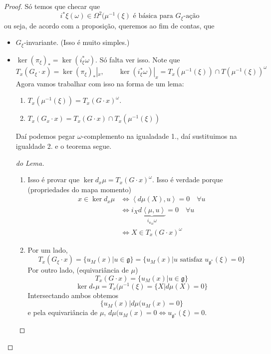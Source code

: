 \begin{proof}\leavevmode
	Só temos que checar que
	\[i^*\xi(\omega)\in\Omega^{2}(\mu^{-1}(\xi) \text{ é básica para $G_\xi$-ação} \]
	ou seja, de acordo com a proposição, queremos ao fim de contas, que
	\begin{itemize}
	\item $G_\xi$-invariante. (Isso é muito simples.)
	\item $\ker(\pi_\xi)_* =\ker(i^*_\xi\omega)$. Só falta ver isso. Note que
		\[T_x(G_\xi\cdot x)=\ker(\pi_\xi)_* |_{x},\qquad \ker(i_\xi^*\omega)|_{x}=T_x(\mu^{-1}(\xi))\cap T(\mu^{-1}(\xi))^\omega\]
		Agora vamos trabalhar com isso na forma de um lema:

	\begin{lemma}\leavevmode
		\begin{enumerate}
			\item $T_x(\mu^{-1}(\xi))=T_x(G\cdot x)^\omega$.
		
			\item $T_x(G_x\cdot x)=T_x(G\cdot x)\cap T_x(\mu^{-1}(\xi))$
		\end{enumerate}
	\end{lemma}
	Daí podemos pegar  $\omega$-complemento na igualadade 1., daí sustituimos na igualdade 2. e o teorema segue.

	\begin{proof}[do Lema]\leavevmode 
	\begin{enumerate}
		\item Isso é provar que $\ker d_x\mu=T_x(G\cdot x)^\omega$. Isso é verdade porque (propriedades do mapa momento)
			\begin{align*}
				x\in\ker d_x\mu&\iff \left<d \mu(X),u\right> =0\quad \forall u\\
				&\iff i_X \underbrace{d \left<\mu,u\right> }_{i_{u_M}\omega}=0\quad \forall u\\
				&\iff X\in T_x(G \cdot x)^\omega
			\end{align*}
		\item Por um lado,
			\[T_x(G_\xi\cdot x)=\{u_M(x)|u\in\mathfrak{g}\}=\{u_M(x)|u\text{ satisfaz }u_{\mathfrak{g}^*}(\xi)=0 \}\]
		Por outro lado, (equivariância de $\mu$)
		\[T_x(G\cdot x)=\{u_M(x)|u\in\mathfrak{g}\}\]
		\[\ker d_* \mu=T_x(\mu^{-1}(\xi)=\{X|d\mu(X)=0\}\]
		Intersectando ambos obtemos
		\[\{u_M(x)|d\mu(u_M(x)=0\}\]
		e pela equivariância de $\mu$, $d\mu(u_M(x)=0\iff u_{\mathfrak{g}^*}(\xi)=0$.
	\end{enumerate}
	\end{proof}
	\end{itemize}
\end{proof}


